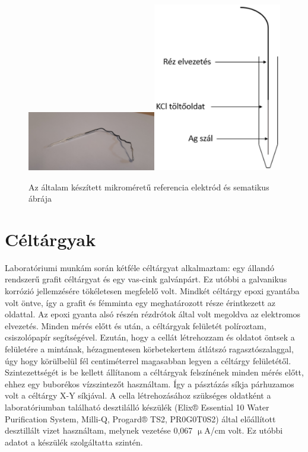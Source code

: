 \begin{figure}
\centering
\includegraphics[width=0.5\textwidth]{img/electrode.eps}\includegraphics[width=0.5\textwidth]{img/electrode1.eps}

\caption{Az általam készített mikroméretű referencia elektród és sematikus ábrája}
\label{fig:electrode}
\end{figure}

\section{Céltárgyak}

Laboratóriumi munkám során kétféle céltárgyat alkalmaztam: egy állandó rendszerű grafit céltárgyat és egy vas-cink galvánpárt. Ez utóbbi a galvanikus korrózió jellemzésére tökéletesen megfelelő volt. Mindkét céltárgy epoxi gyantába volt öntve, így a grafit és fémminta egy meghatározott része érintkezett az oldattal. Az epoxi gyanta alsó részén rézdrótok által volt megoldva az elektromos elvezetés. Minden mérés előtt és után, a céltárgyak felületét políroztam, csiszolópapír segítségével. Ezután, hogy a cellát létrehozzam és oldatot öntsek a felületére a mintának, hézagmentesen körbetekertem átlátszó ragasztószalaggal, úgy hogy körülbelül fél centiméterrel magasabban legyen a céltárgy felületétől. Szintezettségét is be kellett állítanom a céltárgyak felszínének minden mérés előtt, ehhez egy buborékos vízszintezőt használtam. Így a pásztázás síkja párhuzamos volt a céltárgy X-Y síkjával. A cella létrehozásához szükséges oldatként a laboratóriumban található desztilálló készülék (Elix® Essential 10 Water Purification System, Milli-Q, Progard® TS2, PR0G0T0S2) által előállított desztillált vizet használtam, melynek vezetése 0,067 $\upmu$A/cm volt. Ez utóbbi adatot a készülék szolgáltatta szintén.

